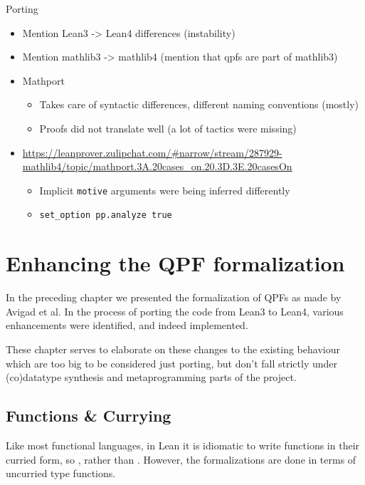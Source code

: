 \documentclass[titlepage]{report}
\newenvironment{todo}{%
\definecolor{shadecolor}{HTML}{F8E0E0}%
\begin{shaded}%
\begin{trivlist}                         
    \item[\hskip \labelsep {\bfseries Todo:}]}{\end{trivlist}\end{shaded}}
\newcommand\lean[1]{{%
\def\leanmode{1}%
\small \texttt{#1}%
\undef\leanmode%
}}
\begin{document}
\begin{todo}
    Porting
    \begin{itemize}
        \item Mention Lean3 -> Lean4 differences (instability)
        \item Mention mathlib3 -> mathlib4 (mention that qpfs are part of mathlib3)
        \item Mathport 
                \begin{itemize}
                    \item Takes care of syntactic differences, different naming conventions (mostly)
                    \item Proofs did not translate well (a lot of tactics were missing)
                \end{itemize}
        \item \url{https://leanprover.zulipchat.com/#narrow/stream/287929-mathlib4/topic/mathport.3A.20cases_on.20.3D.3E.20casesOn}
            \begin{itemize}
                \item Implicit \lean{motive} arguments were being inferred differently
                \item \lean{set\_option pp.analyze true}
            \end{itemize}
    \end{itemize}
\end{todo}




\chapter{Enhancing the QPF formalization}
\label{ch:enhancing}


In the preceding chapter we presented the formalization of QPFs as made by Avigad et al. In the process of porting the code from Lean3 to Lean4, various enhancements were identified, and indeed implemented. 

These chapter serves to elaborate on these changes to the existing behaviour which are too big to be considered just porting, but don't fall strictly under (co)datatype synthesis and metaprogramming parts of the project.






\section{Functions \& Currying}
Like most functional languages, in Lean it is idiomatic to write functions in their curried form, 
so , rather than .
However, the formalizations are done in terms of uncurried type functions.
\end{document}
